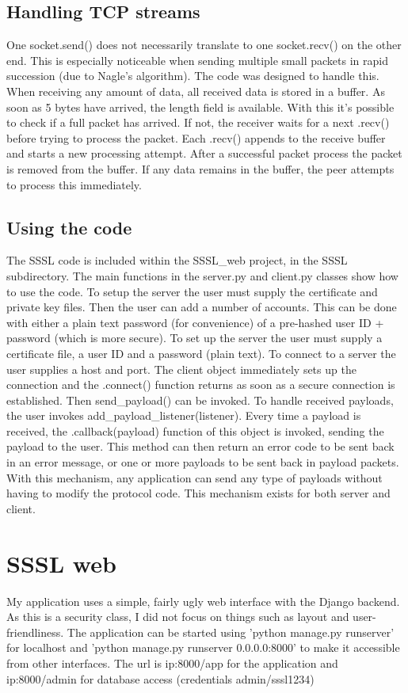 \documentclass{article}
\begin{document}
\subsection{Handling TCP streams}
One socket.send() does not necessarily translate to one socket.recv() on the other end. This is especially noticeable when sending multiple small packets in rapid succession (due to Nagle's algorithm). The code was designed to handle this. When receiving any amount of data, all received data is stored in a buffer. As soon as 5 bytes have arrived, the length field is available. With this it's possible to check if a full packet has arrived. If not, the receiver waits for a next .recv() before trying to process the packet. Each .recv() appends to the receive buffer and starts a new processing attempt. After a successful packet process the packet is removed from the buffer. If any data remains in the buffer, the peer attempts to process this immediately. 

\subsection{Using the code}
The SSSL code is included within the SSSL\_web project, in the SSSL subdirectory.
The main functions in the server.py and client.py classes show how to use the code. To setup the server the user must supply the certificate and private key files. Then the user can add a number of accounts. This can be done with either a plain text password (for convenience) of a pre-hashed user ID + password (which is more secure).
To set up the server the user must supply a certificate file, a user ID and a password (plain text). To connect to a server the user supplies a host and port. The client object immediately sets up the connection and the .connect() function returns as soon as a secure connection is established. Then send\_payload() can be invoked.
To handle received payloads, the user invokes add\_payload\_listener(listener). Every time a payload is received, the .callback(payload) function of this object is invoked, sending the payload to the user. This method can then return an error code to be sent back in an error message, or one or more payloads to be sent back in payload packets. With this mechanism, any application can send any type of payloads without having to modify the protocol code. This mechanism exists for both server and client.


\section{SSSL web}
My application uses a simple, fairly ugly web interface with the Django backend. As this is a security class, I did not focus on things such as layout and user-friendliness. The application can be started using 'python manage.py runserver' for localhost and 'python manage.py runserver 0.0.0.0:8000' to make it accessible from other interfaces. The url is ip:8000/app for the application and ip:8000/admin for database access (credentials admin/sssl1234)
\end{document}
